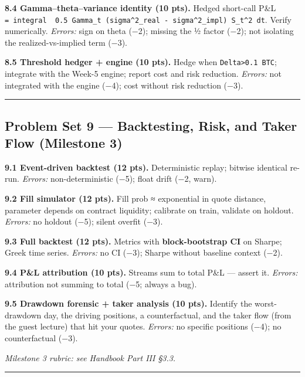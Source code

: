 \documentclass[
]{article}
\begin{document}
\textbf{8.4 Gamma--theta--variance identity (10 pts).} Hedged short-call
P\&L
\texttt{=\ integral\ \ 0.5\ Gamma\_t\ (sigma\^{}2\_real\ -\ sigma\^{}2\_impl)\ S\_t\^{}2\ dt}.
Verify numerically. \emph{Errors:} sign on theta (−2); missing the ½
factor (−2); not isolating the realized-vs-implied term (−3).

\textbf{8.5 Threshold hedger + engine (10 pts).} Hedge when
\texttt{\textbar{}Delta\textbar{}\textgreater{}0.1\ BTC}; integrate with
the Week-5 engine; report cost and risk reduction. \emph{Errors:} not
integrated with the engine (−4); cost without risk reduction (−3).

\begin{center}\rule{0.5\linewidth}{0.5pt}\end{center}

\subsection{Problem Set 9 --- Backtesting, Risk, and Taker Flow
(Milestone
3)}\label{problem-set-9-backtesting-risk-and-taker-flow-milestone-3}

\textbf{9.1 Event-driven backtest (12 pts).} Deterministic replay;
bitwise identical re-run. \emph{Errors:} non-deterministic (−5); float
drift (−2, warn).

\textbf{9.2 Fill simulator (12 pts).} Fill prob ≈ exponential in quote
distance, parameter depends on contract liquidity; calibrate on train,
validate on holdout. \emph{Errors:} no holdout (−5); silent overfit
(−3).

\textbf{9.3 Full backtest (12 pts).} Metrics with
\textbf{block-bootstrap CI} on Sharpe; Greek time series. \emph{Errors:}
no CI (−3); Sharpe without baseline context (−2).

\textbf{9.4 P\&L attribution (10 pts).} Streams sum to total P\&L ---
assert it. \emph{Errors:} attribution not summing to total (−5; always a
bug).

\textbf{9.5 Drawdown forensic + taker analysis (10 pts).} Identify the
worst-drawdown day, the driving positions, a counterfactual, and the
taker flow (from the guest lecture) that hit your quotes. \emph{Errors:}
no specific positions (−4); no counterfactual (−3).

\emph{Milestone 3 rubric: see Handbook Part III §3.3.}

\begin{center}\rule{0.5\linewidth}{0.5pt}\end{center}
\end{document}
